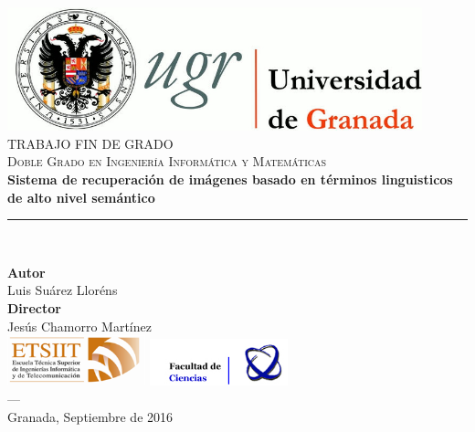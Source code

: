 \begin{titlepage}
 
 
\newlength{\centeroffset}
\setlength{\centeroffset}{-0.5\oddsidemargin}
\addtolength{\centeroffset}{0.5\evensidemargin}
\thispagestyle{empty}

\noindent\hspace*{\centeroffset}\begin{minipage}{\textwidth}

\centering
\includegraphics[width=0.9\textwidth]{img/logo_ugr.jpg}\\[1.4cm]

\textsc{ \Large TRABAJO FIN DE GRADO\\[0.2cm]}
\textsc{ Doble Grado en Ingeniería Informática y Matemáticas}\\[1cm]
% 
{\large\bfseries Sistema de recuperación de imágenes basado en
términos linguisticos de alto nivel semántico
\\
}
\noindent\rule[-1ex]{\textwidth}{3pt}\\[3.5ex]
\end{minipage}

\vspace{2.5cm}
\noindent\hspace*{\centeroffset}\begin{minipage}{\textwidth}
\centering

\textbf{Autor}\\ {Luis Suárez Lloréns}\\[2.5ex]
\textbf{Director}\\
{Jesús Chamorro Martínez}\\[2cm]
\includegraphics[width=0.3\textwidth]{img/logo_etsiit.png} \hfill \includegraphics[width=0.3\textwidth]{img/logo_ciencias.jpg}\\[0.1cm]
\textsc{---}\\
Granada, Septiembre de 2016
\end{minipage}
\end{titlepage}